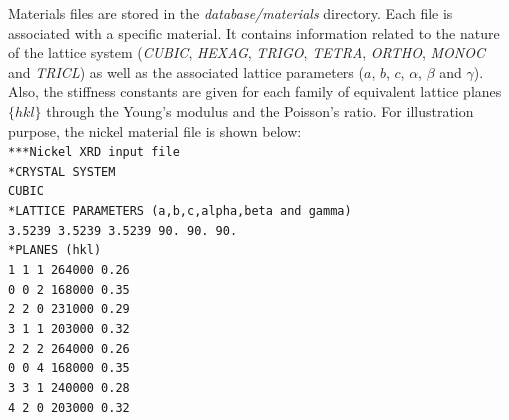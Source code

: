 \documentclass[french,a4paper]{report}
\begin{document}
Materials files are stored in the \textit{database/materials} directory. Each file is associated with a specific material. It contains information related to the nature of the lattice system (\textit{CUBIC}, \textit{HEXAG}, \textit{TRIGO}, \textit{TETRA}, \textit{ORTHO}, \textit{MONOC} and \textit {TRICL}) as well as the associated lattice parameters ($a$, $b$, $c$, $\alpha$, $\beta$ and $\gamma$). Also, the stiffness constants are given for each family of equivalent lattice planes $\{ hkl \}$ through the Young's modulus and the Poisson's ratio. For illustration purpose, the nickel material file is shown below:\\
\texttt{***Nickel XRD input file} \\
\texttt{*CRYSTAL SYSTEM} \\
\texttt{CUBIC} \\
\texttt{*LATTICE PARAMETERS (a,b,c,alpha,beta and gamma)} \\
\texttt{3.5239   3.5239   3.5239   90.   90.   90.} \\
\texttt{*PLANES (hkl)} \\
\texttt{1  1  1     264000   0.26} \\
\texttt{0  0  2     168000   0.35} \\
\texttt{2  2  0     231000   0.29} \\
\texttt{3  1  1     203000   0.32} \\
\texttt{2  2  2     264000   0.26} \\
\texttt{0  0  4     168000   0.35} \\
\texttt{3  3  1     240000   0.28} \\
\texttt{4  2  0     203000   0.32} \\
\label{sec_fichiermateriau}

% 
% 



\end{document}
